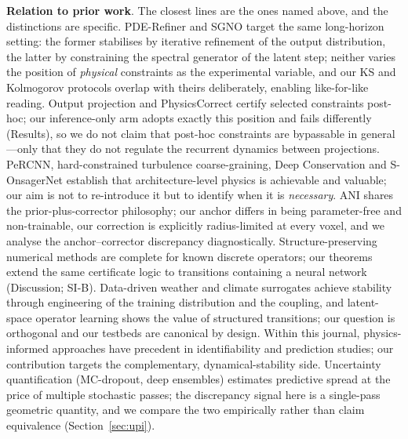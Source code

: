 \documentclass[11pt,a4paper]{article}
\begin{document}
\textbf{Relation to prior work}. The closest lines are the ones named above, and the distinctions are specific. PDE-Refiner\cite{lippe2023pderefiner} and SGNO\cite{li2026sgno} target the same long-horizon setting: the former stabilises by iterative refinement of the output distribution, the latter by constraining the spectral generator of the latent step; neither varies the position of \emph{physical} constraints as the experimental variable, and our KS and Kolmogorov protocols overlap with theirs deliberately, enabling like-for-like reading. Output projection\cite{valente2025projection} and PhysicsCorrect\cite{huang2025physicorrect} certify selected constraints post-hoc; our inference-only arm adopts exactly this position and fails differently (Results), so we do not claim that post-hoc constraints are bypassable in general---only that they do not regulate the recurrent dynamics between projections. PeRCNN\cite{rao2023percnn}, hard-constrained turbulence coarse-graining\cite{mohan2023hard}, Deep Conservation\cite{lee2021deepconservation} and S-OnsagerNet\cite{chen2024onsagernet} establish that architecture-level physics is achievable and valuable; our aim is not to re-introduce it but to identify when it is \emph{necessary}. ANI\cite{wang2026ani} shares the prior-plus-corrector philosophy; our anchor differs in being parameter-free and non-trainable, our correction is explicitly radius-limited at every voxel, and we analyse the anchor--corrector discrepancy diagnostically. Structure-preserving numerical methods\cite{hairer2006gni,chorin1968} are complete for known discrete operators; our theorems extend the same certificate logic to transitions containing a neural network (Discussion; SI-B). Data-driven weather and climate surrogates\cite{lam2023graphcast,kochkov2024neuralgcm,kochkov2021mlcfd,yuval2020stable} achieve stability through engineering of the training distribution and the coupling, and latent-space operator learning\cite{kontolati2024latent} shows the value of structured transitions; our question is orthogonal and our testbeds are canonical by design. Within this journal, physics-informed approaches have precedent in identifiability and prediction studies\cite{kharazmi2021identifiability}; our contribution targets the complementary, dynamical-stability side. Uncertainty quantification (MC-dropout\cite{gal2016dropout}, deep ensembles\cite{lakshminarayanan2017}) estimates predictive spread at the price of multiple stochastic passes; the discrepancy signal here is a single-pass geometric quantity, and we compare the two empirically rather than claim equivalence (Section~\ref{sec:upi}).
\end{document}
